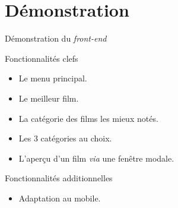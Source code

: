 \section{Démonstration}

\begin{frame}{Démonstration du \textit{front-end}}
  \begin{block}{Fonctionnalités clefs}
    \begin{itemize}
    \item Le menu principal.
    \item Le meilleur film.
    \item La catégorie des films les mieux notés.
    \item Les 3 catégories au choix.
    \item L'aperçu d'un film \textit{via} une fenêtre modale.
    \end{itemize}
  \end{block}

  \begin{block}{Fonctionnalités additionnelles}
    \begin{itemize}
    \item Adaptation au mobile.
    \end{itemize}
  \end{block}
\end{frame}
